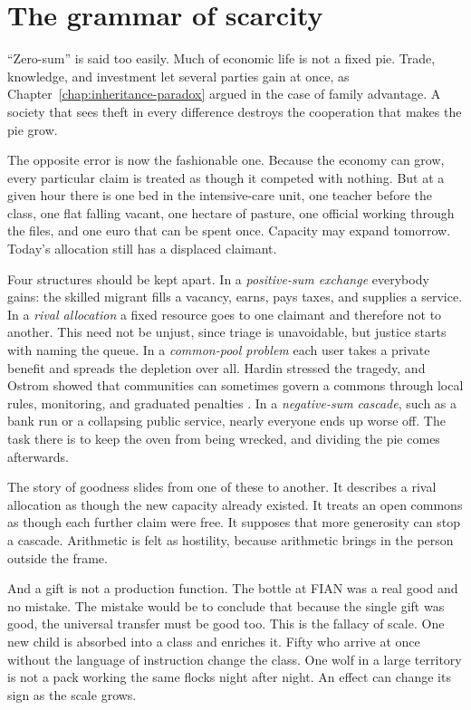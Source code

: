 \documentclass[12pt,a4paper]{book}
\begin{document}
\section{The grammar of scarcity}

``Zero-sum'' is said too easily. Much of economic life is not a fixed pie. Trade, knowledge, and investment let several parties gain at once, as Chapter~\ref{chap:inheritance-paradox} argued in the case of family advantage. A society that sees theft in every difference destroys the cooperation that makes the pie grow.

The opposite error is now the fashionable one. Because the economy can grow, every particular claim is treated as though it competed with nothing. But at a given hour there is one bed in the intensive-care unit, one teacher before the class, one flat falling vacant, one hectare of pasture, one official working through the files, and one euro that can be spent once. Capacity may expand tomorrow. Today's allocation still has a displaced claimant.

Four structures should be kept apart. In a \emph{positive-sum exchange} everybody gains: the skilled migrant fills a vacancy, earns, pays taxes, and supplies a service. In a \emph{rival allocation} a fixed resource goes to one claimant and therefore not to another. This need not be unjust, since triage is unavoidable, but justice starts with naming the queue. In a \emph{common-pool problem} each user takes a private benefit and spreads the depletion over all. Hardin stressed the tragedy, and Ostrom showed that communities can sometimes govern a commons through local rules, monitoring, and graduated penalties \cite{Hardin1968,Ostrom1990}. In a \emph{negative-sum cascade}, such as a bank run or a collapsing public service, nearly everyone ends up worse off. The task there is to keep the oven from being wrecked, and dividing the pie comes afterwards.

The story of goodness slides from one of these to another. It describes a rival allocation as though the new capacity already existed. It treats an open commons as though each further claim were free. It supposes that more generosity can stop a cascade. Arithmetic is felt as hostility, because arithmetic brings in the person outside the frame.

And a gift is not a production function. The bottle at FIAN was a real good and no mistake. The mistake would be to conclude that because the single gift was good, the universal transfer must be good too. This is the fallacy of scale. One new child is absorbed into a class and enriches it. Fifty who arrive at once without the language of instruction change the class. One wolf in a large territory is not a pack working the same flocks night after night. An effect can change its sign as the scale grows.
\end{document}
